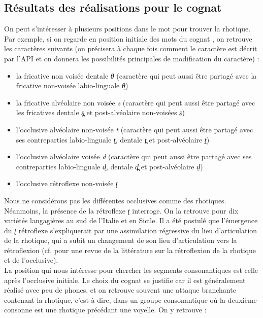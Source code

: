 \subsection{Résultats des réalisations pour le cognat }

On peut s'intéresser à plusieurs positions dans le mot pour trouver la rhotique.
Par exemple, si on regarde en position initiale des mots du cognat , on retrouve les caractères suivants (on précisera à chaque fois comment le caractère est décrit par l'API et on donnera les possibilités principales de modification du caractère) :

\begin{itemize}
	\item la fricative non voisée dentale \textit{θ} (caractère qui peut aussi être partagé avec la fricative non-voisée labio-linguale \textit{θ̼})
	\item la fricative alvéolaire non voisée \textit{s} (caractère qui peut aussi être partagé avec les fricatives dentale \textit{s̪} et post-alvéolaire non-voisées \textit{s̠})
	\item l'occlusive alvéolaire non-voisée \textit{t} (caractère qui peut aussi être partagé avec ses contreparties labio-linguale \textit{t̼}, dentale \textit{t̪} et post-alvéolaire \textit{t̠})
	\item l'occlusive alvéolaire voisée \textit{d} (caractère qui peut aussi être partagé avec ses contreparties labio-linguale \textit{d̼}, dentale \textit{d̪} et post-alvéolaire \textit{d̠})
	\item l'occlusive rétroflexe non-voisée \textit{ʈ}
\end{itemize}

Nous ne considérons pas les différentes occlusives comme des rhotiques. Néanmoins, la présence de la rétroflexe \textit{ʈ} interroge. On la retrouve pour dix variétés langagières au sud de l'Italie et en Sicile.
Il a été postulé que l'émergence du \textit{ʈ} rétroflexe s'expliquerait par une assimilation régressive du lieu d'articulation de la rhotique, qui a subit un changement de son lieu d'articulation vers la rétroflexion (cf. \textcite[53--55]{celataAnalisiProcessiDi2006} pour une revue de la littérature sur la rétroflexion de la rhotique et de l'occlusive).\\

La position qui nous intéresse pour chercher les segments consonantiques  est celle après l'occlusive initiale. Le choix du cognat  se justifie car il est généralement réalisé avec peu de phones, et on retrouve souvent une attaque branchante contenant la rhotique, c'est-à-dire, dans un groupe consonantique où la deuxième consonne est une rhotique précédant une voyelle.
On y retrouve : 

